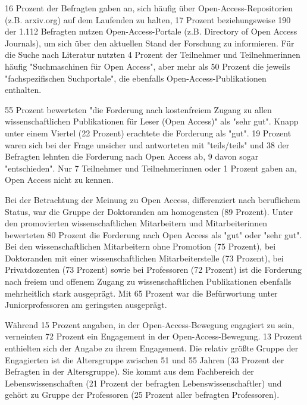 16 Prozent der Befragten gaben an, sich häufig über Open-Access-Repositorien (z.B. arxiv.org) auf dem Laufenden zu halten, 17 Prozent beziehungsweise 190 der 1.112 Befragten nutzen Open-Access-Portale (z.B. Directory of Open Access Journals), um sich über den aktuellen Stand der Forschung zu informieren. Für die Suche nach Literatur nutzten 4 Prozent der Teilnehmer und Teilnehmerinnen häufig "Suchmaschinen für Open Access", aber mehr als 50 Prozent die jeweils "fachspezifischen Suchportale", die ebenfalls Open-Access-Publikationen enthalten.

55 Prozent bewerteten "die Forderung nach kostenfreiem Zugang zu allen wissenschaftlichen Publikationen für Leser (Open Access)" als "sehr gut". Knapp unter einem Viertel (22 Prozent) erachtete die Forderung als "gut". 19 Prozent waren sich bei der Frage unsicher und antworteten mit "teils/teils" und 38 der Befragten lehnten die Forderung nach Open Access ab, 9 davon sogar "entschieden". Nur 7 Teilnehmer und Teilnehmerinnen oder 1 Prozent gaben an, Open Access nicht zu kennen.

Bei der Betrachtung der Meinung zu Open Access, differenziert nach beruflichem Status, war die Gruppe der Doktoranden am homogensten (89 Prozent). Unter den promovierten wissenschaftlichen Mitarbeitern und Mitarbeiterinnen bewerteten 80 Prozent die Forderung nach Open Access als "gut" oder "sehr gut". Bei den wissenschaftlichen Mitarbeitern ohne Promotion (75 Prozent), bei Doktoranden mit einer wissenschaftlichen Mitarbeiterstelle (73 Prozent), bei Privatdozenten (73 Prozent) sowie bei Professoren (72 Prozent) ist die Forderung nach freiem und offenem Zugang zu wissenschaftlichen Publikationen ebenfalls mehrheitlich stark ausgeprägt. Mit 65 Prozent war die Befürwortung unter Juniorprofessoren am geringsten ausgeprägt.

Während 15 Prozent angaben, in der Open-Access-Bewegung engagiert zu sein, verneinten 72 Prozent ein Engagement in der Open-Access-Bewegung. 13 Prozent enthielten sich der Angabe zu ihrem Engagement. Die relativ größte Gruppe der Engagierten ist die Altersgruppe zwischen 51 und 55 Jahren (33 Prozent der Befragten in der Altersgruppe). Sie kommt aus dem Fachbereich der Lebenswissenschaften (21 Prozent der befragten Lebenswissenschaftler) und gehört zu Gruppe der Professoren (25 Prozent aller befragten Professoren).

